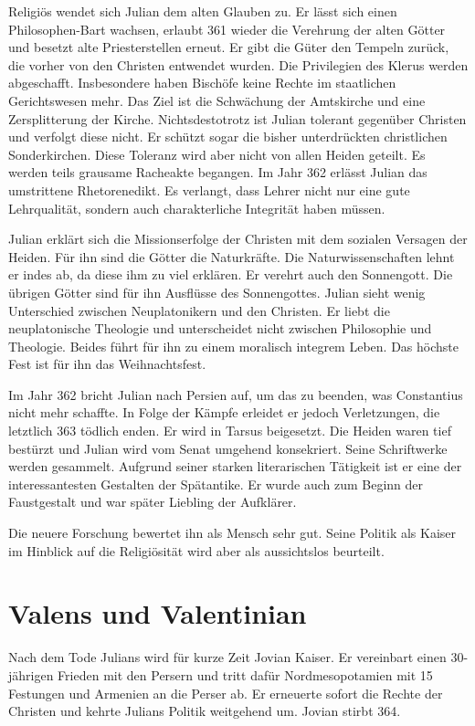 \documentclass[10pt,a4paper,oneside,ngerman,numbers=noenddot]{scrartcl}
\begin{document}
Religiös wendet sich Julian dem alten Glauben zu. Er lässt sich einen Philosophen-Bart
wachsen, erlaubt 361 wieder die Verehrung der alten Götter und besetzt alte Priesterstellen
erneut. Er gibt die Güter den Tempeln zurück, die vorher von den Christen entwendet
wurden. Die Privilegien des Klerus werden abgeschafft. Insbesondere haben Bischöfe
keine Rechte im staatlichen Gerichtswesen mehr. Das Ziel ist die Schwächung
der Amtskirche und eine Zersplitterung der Kirche. Nichtsdestotrotz ist Julian
tolerant gegenüber Christen und verfolgt diese nicht. Er schützt sogar die bisher
unterdrückten christlichen Sonderkirchen. Diese Toleranz wird aber nicht von allen
Heiden geteilt. Es werden teils grausame Racheakte begangen.
Im Jahr 362 erlässt Julian das umstrittene Rhetorenedikt. Es verlangt, dass Lehrer
nicht nur eine gute Lehrqualität, sondern auch charakterliche Integrität haben
müssen.

Julian erklärt sich die Missionserfolge der Christen mit dem sozialen
Versagen der Heiden. Für ihn sind die Götter die Naturkräfte. Die Naturwissenschaften
lehnt er indes ab, da diese ihm zu viel erklären. Er verehrt auch den Sonnengott.
Die übrigen Götter sind für ihn Ausflüsse des Sonnengottes. Julian sieht wenig
Unterschied zwischen Neuplatonikern und den Christen. Er liebt die neuplatonische
Theologie und unterscheidet nicht zwischen Philosophie und Theologie. Beides führt
für ihn zu einem moralisch integrem Leben. Das höchste Fest ist für ihn das
Weihnachtsfest.

Im Jahr 362 bricht Julian nach Persien auf, um das zu beenden, was Constantius
nicht mehr schaffte. In Folge der Kämpfe erleidet er jedoch Verletzungen, die
letztlich 363 tödlich enden. Er wird in Tarsus beigesetzt. Die Heiden waren tief
bestürzt und Julian wird vom Senat umgehend konsekriert. Seine Schriftwerke werden
gesammelt. Aufgrund seiner starken literarischen Tätigkeit ist er eine der
interessantesten Gestalten der Spätantike. Er wurde auch zum Beginn der Faustgestalt
und war später Liebling der Aufklärer.

Die neuere Forschung bewertet ihn als Mensch sehr gut. Seine Politik als
Kaiser im Hinblick auf die Religiösität wird aber als aussichtslos beurteilt.

\section*{Valens und Valentinian}

Nach dem Tode Julians wird für kurze Zeit Jovian Kaiser. Er vereinbart einen
30-jährigen Frieden mit den Persern und tritt dafür Nordmesopotamien mit 15
Festungen und Armenien an die Perser ab. Er erneuerte sofort die Rechte der
Christen und kehrte Julians Politik weitgehend um. Jovian stirbt 364.
\end{document}
